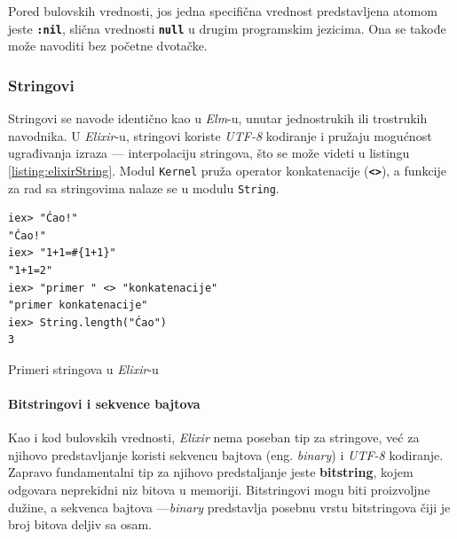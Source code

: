 \documentclass[12pt,oneside]{memoir}
\begin{document}
Pored bulovskih vrednosti, jos jedna specifična vrednost predstavljena atomom jeste
\texttt{\textbf{:nil}}, slična vrednosti \texttt{\textbf{null}} u drugim programskim jezicima.
Ona se takođe može navoditi bez početne dvotačke.
\subsubsection{Stringovi}
Stringovi se navode identično kao u \emph{Elm}-u, unutar jednostrukih ili trostrukih navodnika. 
U \emph{Elixir}-u, stringovi koriste \emph{UTF-8} kodiranje i pružaju mogućnost ugrađivanja izraza --- interpolaciju
stringova, što se može videti u listingu \ref{listing:elixirString}. Modul \texttt{Kernel}
pruža operator konkatenacije (\texttt{\textbf{<>}}), a funkcije za rad sa stringovima nalaze
se u modulu \texttt{String}.
\begin{listing}[!h]
\begin{verbatim}
iex> "Ćao!"
"Ćao!"
iex> "1+1=#{1+1}"
"1+1=2"
iex> "primer " <> "konkatenacije"
"primer konkatenacije"
iex> String.length("Ćao")
3
\end{verbatim}
\caption{Primeri stringova u \emph{Elixir}-u}
\label{listing:elixirString}
\end{listing}
\paragraph{Bitstringovi i sekvence bajtova}
Kao i kod bulovskih vrednosti, \emph{Elixir} nema poseban tip za stringove, već za njihovo
predstavljanje koristi sekvencu bajtova (eng. \emph{binary}) i \emph{UTF-8} kodiranje.
Zapravo fundamentalni tip za njihovo predstaljanje jeste \textbf{bitstring}, kojem odgovara 
neprekidni niz bitova u memoriji. Bitstringovi mogu biti proizvoljne dužine, a sekvenca
bajtova ---\emph{binary} predstavlja posebnu vrstu bitstringova čiji je broj bitova deljiv sa
osam. 
\end{document}
